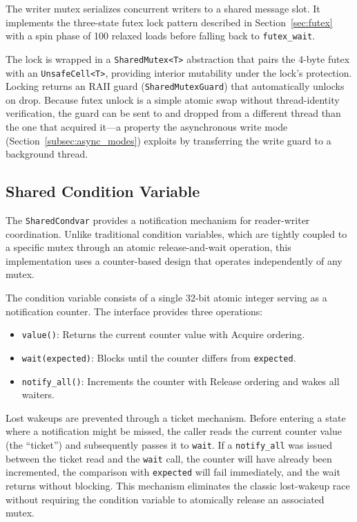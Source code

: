 The writer mutex serializes concurrent writers to a shared message slot. It implements the three-state futex lock pattern described in Section~\ref{sec:futex} with a spin phase of 100 relaxed loads before falling back to \texttt{futex\_wait}.

The lock is wrapped in a \texttt{SharedMutex<T>} abstraction that pairs the 4-byte futex with an \texttt{UnsafeCell<T>}, providing interior mutability under the lock's protection. Locking returns an RAII guard (\texttt{SharedMutexGuard}) that automatically unlocks on drop. Because futex unlock is a simple atomic swap without thread-identity verification, the guard can be sent to and dropped from a different thread than the one that acquired it---a property the asynchronous write mode (Section~\ref{subsec:async_modes}) exploits by transferring the write guard to a background thread.

\subsection{Shared Condition Variable}
\label{subsec:shared_condvar}

The \texttt{SharedCondvar} provides a notification mechanism for reader-writer coordination. Unlike traditional condition variables, which are tightly coupled to a specific mutex through an atomic release-and-wait operation, this implementation uses a counter-based design that operates independently of any mutex.

The condition variable consists of a single 32-bit atomic integer serving as a notification counter. The interface provides three operations:

\begin{itemize}
    \item \texttt{value()}: Returns the current counter value with Acquire ordering.
    \item \texttt{wait(expected)}: Blocks until the counter differs from \texttt{expected}.
    \item \texttt{notify\_all()}: Increments the counter with Release ordering and wakes all waiters.
\end{itemize}

Lost wakeups are prevented through a ticket mechanism. Before entering a state where a notification might be missed, the caller reads the current counter value (the ``ticket'') and subsequently passes it to \texttt{wait}. If a \texttt{notify\_all} was issued between the ticket read and the \texttt{wait} call, the counter will have already been incremented, the comparison with \texttt{expected} will fail immediately, and the wait returns without blocking. This mechanism eliminates the classic lost-wakeup race without requiring the condition variable to atomically release an associated mutex.

